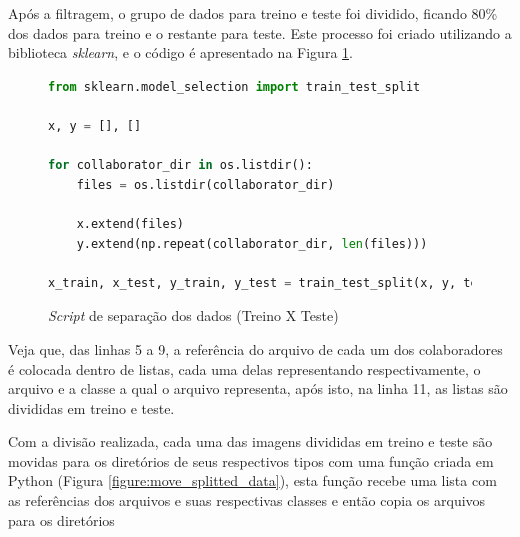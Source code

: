 
\par Após a filtragem, o grupo de dados para treino e teste foi dividido, ficando 80\% dos dados para treino e o restante para teste. Este processo foi criado utilizando a biblioteca \textit{sklearn}, e o código é apresentado na Figura \ref{figure:split_train_test_data}.

\begin{figure}[H]
    \centering
    \caption{\textit{Script} de separação dos dados (Treino X Teste)}
    \begin{lstlisting}[language=Python]
from sklearn.model_selection import train_test_split

x, y = [], []

for collaborator_dir in os.listdir():
    files = os.listdir(collaborator_dir)

    x.extend(files)
    y.extend(np.repeat(collaborator_dir, len(files)))

x_train, x_test, y_train, y_test = train_test_split(x, y, test_size=0.20, random_state=992)    
\end{lstlisting}
    \label{figure:split_train_test_data}
\end{figure}

\par Veja que, das linhas 5 a 9, a referência do arquivo de cada um dos colaboradores é colocada dentro de listas, cada uma delas representando respectivamente, o arquivo e a classe a qual o arquivo representa, após isto, na linha 11, as listas são divididas em treino e teste.


\par Com a divisão realizada, cada uma das imagens divididas em treino e teste são movidas para os diretórios de seus respectivos tipos com uma função criada em Python (Figura \ref{figure:move_splitted_data}), esta função recebe uma lista com as referências dos arquivos e suas respectivas classes e então copia os arquivos para os diretórios

